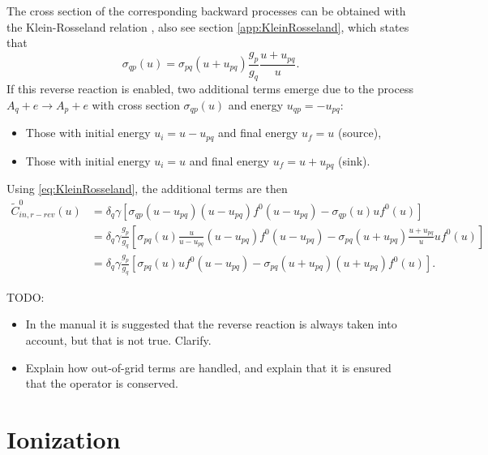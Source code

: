 \documentclass{book}
\begin{document}
The cross section of the corresponding backward processes can be obtained with
the Klein-Rosseland relation \cite{Klein1921}, also see section
\ref{app:KleinRosseland}, which states that
\begin{equation}
	\sigma_{qp}(u)
	=
	\sigma_{pq}(u+u_{pq})\frac{g_p}{g_q}\frac{u+u_{pq}}{u}.
	\label{eq:KleinRosseland}
\end{equation}
If this reverse reaction is enabled, two additional terms emerge due to the
process $A_q + e \rightarrow A_p + e$ with cross section $\sigma_{qp}(u)$
and energy $u_{qp}=-u_{pq}$:
\begin{itemize}
	\item Those with initial energy $u_i=u-u_{pq}$ and final energy $u_f=u$ (source),
	\item Those with initial energy $u_i=u$ and final energy $u_f=u+u_{pq}$ (sink).
\end{itemize}
Using \eqref{eq:KleinRosseland}, the additional terms are then
\begin{align}
	\tilde{C}^0_{in,r-rev}(u)
	&=  \delta_q \gamma[
		\sigma_{qp}(u-u_{pq})(u-u_{pq})f^0(u-u_{pq})
		-
		\sigma_{qp}(u)uf^0(u)
	]
	\nonumber \\
	&=  \delta_q \gamma\frac{g_p}{g_q}\left[
		\sigma_{pq}(u)\frac{u}{u-u_{pq}}(u-u_{pq})f^0(u-u_{pq})
		-
		\sigma_{pq}(u+u_{pq})\frac{u+u_{pq}}{u}uf^0(u)
	\right]
	\nonumber \\
	&=  \delta_q \gamma\frac{g_p}{g_q}\left[
		\sigma_{pq}(u)uf^0(u-u_{pq})
		-
		\sigma_{pq}(u+u_{pq})(u+u_{pq})f^0(u)
	\right].
\end{align}

TODO:
\begin{itemize}
	\item In the manual \cite[eq. 13a]{Manual_2_2_0} it is suggested that
		the reverse reaction is always taken into account, but that
		is not true. Clarify.
	\item Explain how out-of-grid terms are handled, and explain that
		it is  ensured that the operator is conserved.
\end{itemize}

\section{Ionization}
\end{document}
